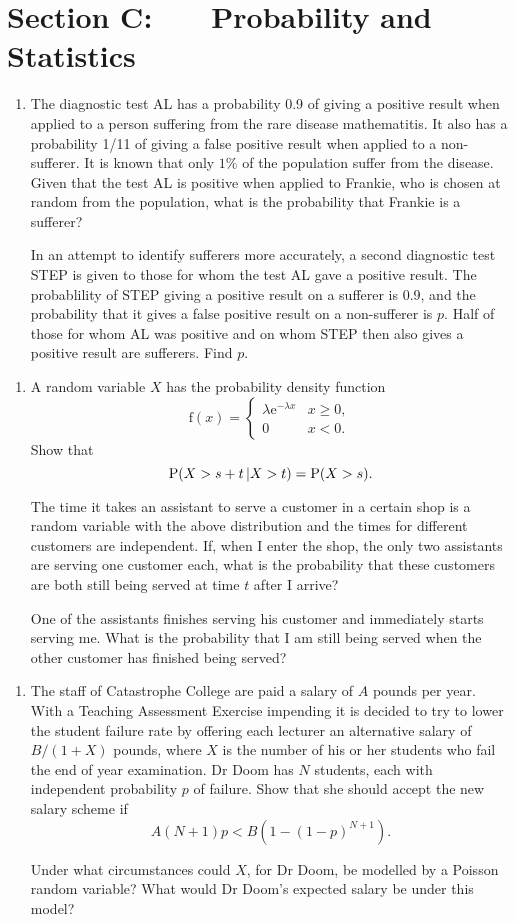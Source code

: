 \documentclass[a4, 11pt]{report}
\newlength{\qspace}
\newcounter{qnumber}
\newenvironment{question}%
 {\vspace{\qspace}
  \begin{enumerate}[\bfseries 1\quad][10]%
    \setcounter{enumi}{\value{qnumber}}%
    \item%
 }
{
  \end{enumerate}
  \filbreak
  \stepcounter{qnumber}
 }
\begin{document}
	
	\newpage
\section*{Section C: \ \ \ Probability and Statistics}


\begin{question}
The diagnostic test AL has a probability 0.9 of giving a positive result when
applied to a person suffering from the rare disease mathematitis. It also
has a probability 1/11 of giving a false positive result when applied to a 
non-sufferer. It is known that only $1\%$ of the population suffer from the 
disease. Given that the test AL is positive when applied to Frankie, who is
chosen at random from the population, what is
the probability that Frankie is a sufferer?

In an attempt to identify sufferers more accurately, a second diagnostic test
STEP is given to those for whom the test AL gave a positive result. The 
probablility of STEP giving a positive result on a sufferer is
0.9, and the probability that it gives a false positive 
result on a non-sufferer is $p$.
Half of those for whom AL was positive and on whom STEP then also gives
a positive result are sufferers. Find $p$.

\end{question}

\begin{question}
A random variable $X$ has the probability density function
\[
\mathrm{f}(x)=\begin{cases}
\lambda\mathrm{e}^{-\lambda x} & x\geqslant0,\\
0 & x<0.
\end{cases}
\]
Show that
$${\rm  P}(X>s+t\,\vert X>t) = {\rm P}(X>s).$$

The time it takes an assistant to serve a customer in a certain shop
is a random variable with the above distribution
and the times for different customers are independent. If, when I enter the
shop, the only two assistants are
serving one customer each, what is the probability that these customers
are both still being served at time $t$ after I arrive?

One of the assistants finishes serving his customer
and immediately starts serving me.
 What is the probability that I am still
being served when the other  customer has finished being served?
\end{question}

\begin{question}
The staff of Catastrophe College are paid a salary of $A$ pounds per year.
With a Teaching Assessment Exercise impending it is decided to try to lower
the student failure rate  by offering each lecturer an alternative
salary of $B/(1+X)$ pounds, where $X$ is the number of his or her 
students who fail
the end of year examination. Dr Doom has $N$ students,
each with independent probability $p$ of failure. Show that
she should accept the new salary scheme if
$$A(N+1)p<B(1-(1-p)^{N+1}).$$

Under what circumstances could $X$, for Dr Doom,
be modelled by a Poisson random variable?
What would Dr Doom's expected salary be under this model?
\end{question}
	
\end{document}
